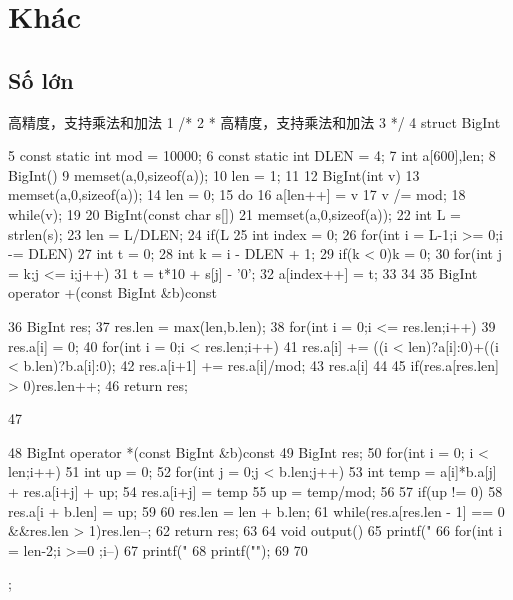 \documentclass[11pt]{article}
\begin{document}
\section{Khác}

\subsection{Số lớn}

\begin{Code}
   高精度，支持乘法和加法
 1 /*
 2 * 高精度，支持乘法和加法
 3 */
 4 struct BigInt{
 5     const static int mod = 10000;
 6     const static int DLEN = 4;
 7     int a[600],len;
 8     BigInt(){
 9         memset(a,0,sizeof(a));
10         len = 1;
11     }
12     BigInt(int v){
13         memset(a,0,sizeof(a));
14         len = 0;
15         do{
16             a[len++] = v%
17             v /= mod;
18         }while(v);
19     }
20     BigInt(const char s[]){
21         memset(a,0,sizeof(a));
22         int L = strlen(s);
23         len = L/DLEN;
24         if(L%
25         int index = 0;
26         for(int i = L-1;i >= 0;i -= DLEN){
27             int t = 0;
28             int k = i - DLEN + 1;
29             if(k < 0)k = 0;
30             for(int j = k;j <= i;j++)
31                  t = t*10 + s[j] - '0';
32             a[index++] = t;
33         }
34     }
35     BigInt operator +(const BigInt &b)const{
36         BigInt res;
37         res.len = max(len,b.len);
38         for(int i = 0;i <= res.len;i++)
39             res.a[i] = 0;
40         for(int i = 0;i < res.len;i++){
41             res.a[i] += ((i < len)?a[i]:0)+((i < b.len)?b.a[i]:0);
42             res.a[i+1] += res.a[i]/mod;
43             res.a[i] %
44         }
45         if(res.a[res.len] > 0)res.len++;
46         return res;


47       }
48       BigInt operator *(const BigInt &b)const{
49           BigInt res;
50           for(int i = 0; i < len;i++){
51               int up = 0;
52               for(int j = 0;j < b.len;j++){
53                   int temp = a[i]*b.a[j] + res.a[i+j] + up;
54                   res.a[i+j] = temp%
55                   up = temp/mod;
56               }
57               if(up != 0)
58                   res.a[i + b.len] = up;
59           }
60           res.len = len + b.len;
61           while(res.a[res.len - 1] == 0 &&res.len > 1)res.len--;
62           return res;
63       }
64       void output(){
65           printf("%
66           for(int i = len-2;i >=0 ;i--)
67               printf("%
68           printf("\n");
69       }
70 };
\end{Code}
\end{document}
